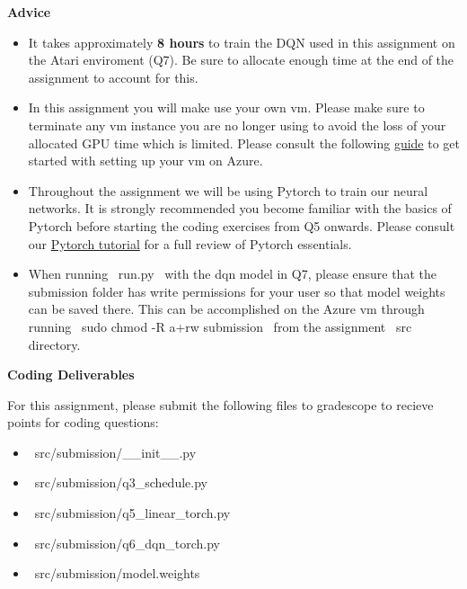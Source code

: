 \textbf{Advice}
\begin{itemize}
  \item It takes approximately \textbf{8 hours} to train the DQN used in this assignment on the Atari enviroment (Q7). Be sure to allocate enough time at the end of the assignment to account for this.

  \item In this assignment you will make use your own vm. Please make sure to terminate any vm instance you are no longer using to avoid the loss of your allocated GPU time which is limited. Please consult the following \href{https://github.com/scpd-proed/XCS234-Handouts/blob/main/Azure/Azure%20Guide.pdf}{guide} to get started with setting up your vm on Azure.
  
  \item Throughout the assignment we will be using Pytorch to train our neural networks. It is strongly recommended you become familiar with the basics of Pytorch before starting the coding exercises from Q5 onwards. Please consult our \href{https://colab.research.google.com/drive/1BZ89PnXpzN2US_OxwuQCazucmuTpuIfS?usp=sharing}{Pytorch tutorial} for a full review of Pytorch essentials.

  \item When running ~run.py~ with the dqn model in Q7, please ensure that the submission folder has write permissions for your user so that model weights can be saved there. This can be accomplished on the Azure vm through running ~sudo chmod -R a+rw submission~ from the assignment ~src~ directory.
\end{itemize}


\textbf{Coding Deliverables}

For this assignment, please submit the following files to gradescope to recieve points for coding questions:
\begin{itemize}
    \item ~src/submission/__init__.py~
    \item ~src/submission/q3_schedule.py~
    \item ~src/submission/q5_linear_torch.py~
    \item ~src/submission/q6_dqn_torch.py~
    \item ~src/submission/model.weights~
\end{itemize}  




    
